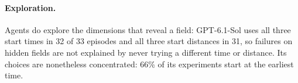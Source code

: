 \paragraph{Exploration.} Agents do explore the dimensions that reveal a field: GPT-6.1-Sol uses all three start times in 32 of 33 episodes and all three start distances in 31, so failures on hidden fields are not explained by never trying a different time or distance. Its choices are nonetheless concentrated: 66\% of its experiments start at the earliest time. 
